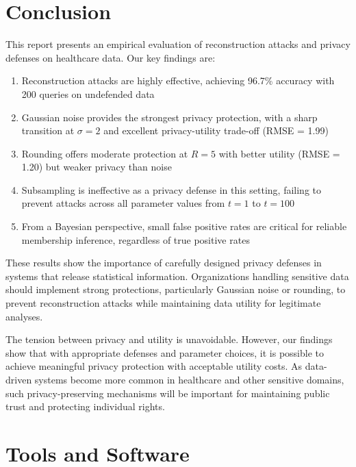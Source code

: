 \documentclass[11pt,letterpaper]{article}
\begin{document}
\section{Conclusion}

This report presents an empirical evaluation of reconstruction attacks and privacy defenses on healthcare data. Our key findings are:

\begin{enumerate}[leftmargin=*]
    \item Reconstruction attacks are highly effective, achieving 96.7\% accuracy with 200 queries on undefended data
    
    \item Gaussian noise provides the strongest privacy protection, with a sharp transition at $\sigma = 2$ and excellent privacy-utility trade-off (RMSE = 1.99)
    
    \item Rounding offers moderate protection at $R = 5$ with better utility (RMSE = 1.20) but weaker privacy than noise
    
    \item Subsampling is ineffective as a privacy defense in this setting, failing to prevent attacks across all parameter values from $t=1$ to $t=100$
    
    \item From a Bayesian perspective, small false positive rates are critical for reliable membership inference, regardless of true positive rates
\end{enumerate}

These results show the importance of carefully designed privacy defenses in systems that release statistical information. Organizations handling sensitive data should implement strong protections, particularly Gaussian noise or rounding, to prevent reconstruction attacks while maintaining data utility for legitimate analyses.

The tension between privacy and utility is unavoidable. However, our findings show that with appropriate defenses and parameter choices, it is possible to achieve meaningful privacy protection with acceptable utility costs. As data-driven systems become more common in healthcare and other sensitive domains, such privacy-preserving mechanisms will be important for maintaining public trust and protecting individual rights.

\section*{Tools and Software}
\end{document}
